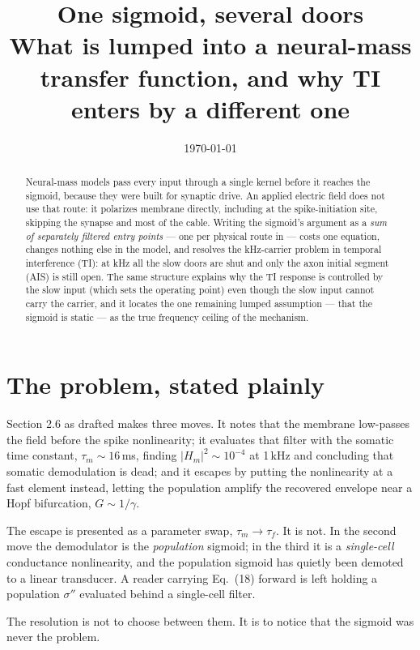 \documentclass[11pt,a4paper]{article}
\title{\vspace{-1.5em}One sigmoid, several doors\\
\large What is lumped into a neural-mass transfer function, and why TI enters by a different one}
\author{}
\date{\today}
\begin{document}
\maketitle
\vspace{-2.5em}

\begin{abstract}
\noindent Neural-mass models pass every input through a single kernel before it reaches the sigmoid,
because they were built for synaptic drive. An applied electric field does not use that route: it
polarizes membrane directly, including at the spike-initiation site, skipping the synapse and most of
the cable. Writing the sigmoid's argument as a \emph{sum of separately filtered entry points} --- one
per physical route in --- costs one equation, changes nothing else in the model, and resolves the
kHz-carrier problem in temporal interference (TI): at kHz all the slow doors are shut and only the axon
initial segment (AIS) is still open. The same structure explains why the TI response is controlled by
the slow input (which sets the operating point) even though the slow input cannot carry the carrier,
and it locates the one remaining lumped assumption --- that the sigmoid is static --- as the true
frequency ceiling of the mechanism.
\end{abstract}

\section{The problem, stated plainly}

Section 2.6 as drafted makes three moves. It notes that the membrane low-passes the field before the
spike nonlinearity; it evaluates that filter with the somatic time constant, $\tau_m\sim16$\,ms,
finding $|H_m|^2\sim10^{-4}$ at 1\,kHz and concluding that somatic demodulation is dead; and it escapes
by putting the nonlinearity at a fast element instead, letting the population amplify the recovered
envelope near a Hopf bifurcation, $G\sim1/\gamma$.

The escape is presented as a parameter swap, $\tau_m\rightarrow\tau_f$. It is not. In the second move
the demodulator is the \emph{population} sigmoid; in the third it is a \emph{single-cell} conductance
nonlinearity, and the population sigmoid has quietly been demoted to a linear transducer. A reader
carrying Eq.~(18) forward is left holding a population $\sigma''$ evaluated behind a single-cell filter.

The resolution is not to choose between them. It is to notice that the sigmoid was never the problem.
\end{document}

